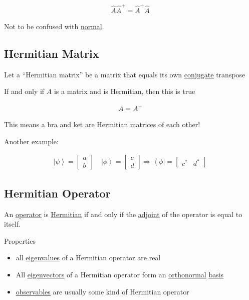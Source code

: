 \documentclass[
]{article}
\providecommand{\tightlist}{%
  \setlength{\itemsep}{0pt}\setlength{\parskip}{0pt}}
\let\oldhyperref\hyperref
\renewcommand{\hyperref}[2][]{\oldhyperref[#1]{\underline{#2}}}
\providecommand{\ket}[1]{\left\lvert #1 \right\rangle}
\providecommand{\bra}[1]{\left\langle #1 \right\rvert}
\providecommand{\Rarr}{\Rightarrow}
\begin{document}
\begin{gather*}
	\hat{A}\hat{A}^+=\hat{A}^+\hat{A}
\end{gather*}

Not to be confused with \hyperref[normal]{normal}.

\subsection{Hermitian Matrix}\label{hermitian-matrix}

Let a ``Hermitian matrix'' be a matrix that equals its own \hyperref[conjugate]{conjugate}
transpose

If and only if \(A\) is a matrix and is Hermitian, then this is true

\begin{gather*}
	A=A^+
\end{gather*}

This means a bra and ket are Hermitian matrices of each other!

Another example:

\begin{gather*}
	\ket{\psi}=\begin{bmatrix}a\\b\end{bmatrix}\quad \ket{\phi}=\begin{bmatrix}c\\d\end{bmatrix}\Rarr \bra{\phi}=\begin{bmatrix}c^* & d^*\end{bmatrix}
\end{gather*}

\subsection{Hermitian Operator}\label{hermitian-operators}

An \hyperref[operators]{operator} is \hyperref[hermitian-matrix]{Hermitian} if and only if the \hyperref[adjoint]{adjoint} of the operator is
equal to itself.


Properties

\begin{itemize}
	\tightlist
	\item
	      all \hyperref[eigenvectorseigenvalues]{eigenvalues} of a Hermitian operator are real
	\item
	      All \hyperref[eigenvectorseigenvalues]{eigenvectors} of a Hermitian operator form an \hyperref[orthonormality]{orthonormal} \hyperref[basis-states]{basis}
	\item
	      \hyperref[observables]{observables} are usually some kind of Hermitian operator
\end{itemize}
\end{document}
